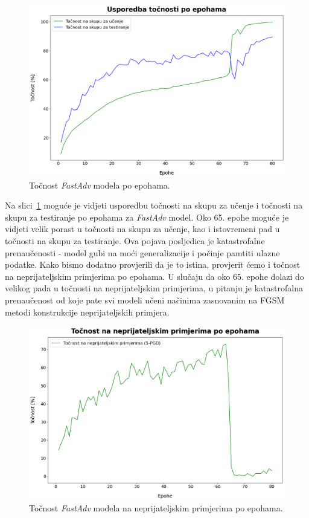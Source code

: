 \documentclass[times, utf8, zavrsni, numeric]{fer}
\begin{document}
\begin{figure}[htb]
    \centering
    \includegraphics[scale=0.41]{../stats/resnet18_fast_epochs_80_lr_0.2_no_early/accuracies.png}
    \caption{Točnost \textit{FastAdv} modela po epohama.}
    \label{fig:fast_acc}
\end{figure}

Na slici~\ref{fig:fast_acc} moguće je vidjeti usporedbu točnosti na skupu za učenje i točnosti na skupu za testiranje po epohama za \textit{FastAdv} model.
Oko 65. epohe moguće je vidjeti velik porast u točnosti na skupu za učenje, kao i istovremeni pad u točnosti na skupu za testiranje.
Ova pojava posljedica je katastrofalne prenaučenosti - model gubi na moći generalizacije i počinje pamtiti ulazne podatke. 
Kako bismo dodatno provjerili da je to istina, provjerit ćemo i točnost na neprijateljskim primjerima po epohama. 
U slučaju da oko 65. epohe dolazi do velikog pada u točnosti na neprijateljskim primjerima, 
u pitanju je katastrofalna prenaučenost od koje pate svi modeli učeni načinima zasnovanim na FGSM metodi konstrukcije neprijateljskih primjera.

\begin{figure}[htb]
    \centering
    \includegraphics[scale=0.41]{../stats/resnet18_fast_epochs_80_lr_0.2_no_early/adv_accuracies.png}
    \caption{Točnost \textit{FastAdv} modela na neprijateljskim primjerima po epohama.}
    \label{fig:fast_adv_acc}
\end{figure}
\end{document}
